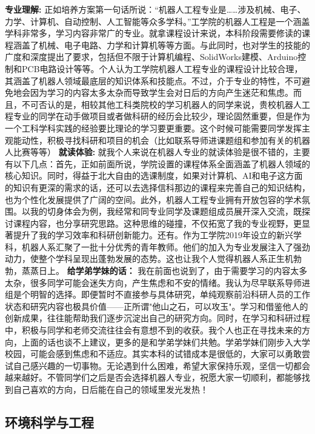 \documentclass[11pt,oneside]{book}
\begin{document}
\textbf{专业理解:}
	正如培养方案第一句话所说：“机器人工程专业是……涉及机械、电子、力学、计算机、自动控制、人工智能等众多学科。”工学院的机器人工程是一个涵盖学科非常多，学习内容非常广的专业。就拿课程设计来说，本科阶段需要修读的课程涵盖了机械、电子电路、力学和计算机等等方面。与此同时，也对学生的技能的广度和深度提出了要求，包括但不限于计算机编程、SolidWorks建模、Arduino控制和PCB电路设计等等。个人认为工学院机器人工程专业的课程设计比较合理，其涵盖了机器人领域最底层的知识体系和技能点。不过，介于专业的特性，不可避免地会因为学习的内容太多太杂而导致学生会对日后的方向产生迷茫和焦虑。而且，不可否认的是，相较其他工科类院校的学习机器人的同学来说，贵校机器人工程专业的同学在动手做项目或者做科研的经历会比较少，理论固然重要，但是作为一个工科学科实践的经验要比理论的学习要更重要。这个时候可能需要同学发挥主观能动性，积极寻找科研和项目的机会（比如联系导师进课题组和参加有关的机器人比赛等等）
 \textbf{就读体验:}
	就我个人来说在机器人专业的就读体验是很不错的，主要有以下几点：首先，正如前面所说，学院设置的课程体系全面涵盖了机器人领域的核心知识。同时，得益于北大自由的选课制度，如果对计算机、AI和电子这方面的知识有更深的需求的话，还可以去选择信科那边的课程来完善自己的知识结构，也为个性化发展提供了广阔的空间。此外，机器人工程专业拥有开放包容的学术氛围。以我的切身体会为例，我经常和同专业同学及课题组成员展开深入交流，既探讨课程内容，也分享研究思路。这种思维的碰撞，不仅拓宽了我的专业视野，更显著提升了我的学习效率和科研创新能力。还有。作为工学院2019年设立的新兴学科，机器人系汇聚了一批十分优秀的青年教师。他们的加入为专业发展注入了强劲动力，使整个学科呈现出蓬勃发展的态势。这也让我个人觉得机器人系正生机勃勃，蒸蒸日上。
 \textbf{给学弟学妹的话：}
	我在前面也说到了，由于需要学习的内容太多太杂，很多同学可能会迷失方向，产生焦虑和不安的情绪。我认为尽早联系导师进组是个明智的选择。即便暂时不直接参与具体研究，单纯观察前沿科研人员的工作状态和研究内容也极具价值——正所谓"他山之石，可以攻玉"。学习和借鉴他人的创新成果，往往能帮助我们逐步沉淀出自己的研究方向。同时，在学习和科研过程中，积极与同学和老师交流往往会有意想不到的收获。我个人也正在寻找未来的方向，上面的话也谈不上建议，更多的是和学弟学妹们共勉。学弟学妹们刚步入大学校园，可能会感到焦虑和不适应。其实本科的试错成本是很低的，大家可以勇敢尝试自己感兴趣的一切事物。无论遇到什么困难，希望大家保持乐观，坚信一切都会越来越好。不管同学们之后是否会选择机器人专业，祝愿大家一切顺利，都能够找到自己喜欢的方向，日后能在自己的领域里发光发热！


\subsection{环境科学与工程}
\end{document}
